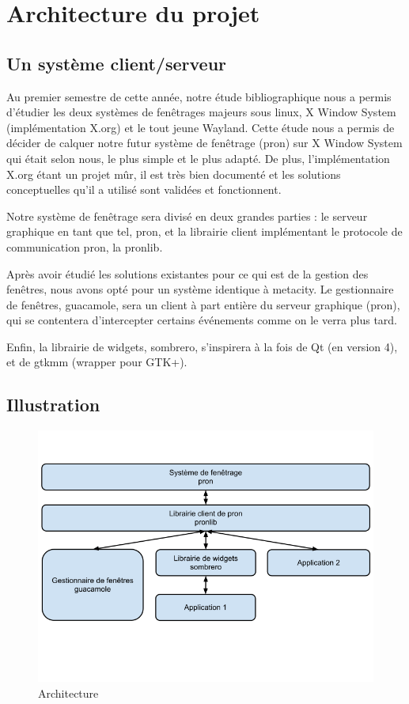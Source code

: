 \section{Architecture du projet}

\subsection{Un système client/serveur}

Au premier semestre de cette année, notre étude bibliographique nous a permis d'étudier les deux systèmes de fenêtrages majeurs sous linux, X Window System (implémentation X.org) et le tout jeune Wayland.
Cette étude nous a permis de décider de calquer notre futur système de fenêtrage (pron) sur X Window System qui était selon nous, le plus simple et le plus adapté.
De plus, l'implémentation X.org étant un projet mûr, il est très bien documenté et les solutions conceptuelles qu'il a utilisé sont validées et fonctionnent.

Notre système de fenêtrage sera divisé en deux grandes parties : le serveur graphique en tant que tel, pron, et la librairie client implémentant le protocole de communication pron, la pronlib.

Après avoir étudié les solutions existantes pour ce qui est de la gestion des fenêtres, nous avons opté pour un système identique à metacity.
Le gestionnaire de fenêtres, guacamole, sera un client à part entière du serveur graphique (pron), qui se contentera d'intercepter certains événements comme on le verra plus tard.

Enfin, la librairie de widgets, sombrero, s'inspirera à la fois de Qt (en version 4), et de gtkmm (wrapper pour GTK+).

\subsection{Illustration}
  
\begin{figure}[H]
  \centering
  \includegraphics[width=14cm]{images/architecture.png}
  \caption{Architecture}
  \label{fig:architecture}
\end{figure}

